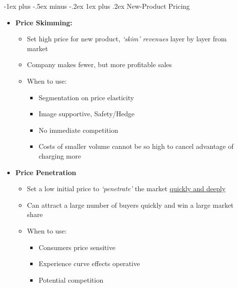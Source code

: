 \documentclass[10pt,landscape]{article}
\makeatletter
\newcommand{\subsubsubsection}{\@startsection{subsubsection}{3}{0mm}%
                                {-1ex plus -.5ex minus -.2ex}%
                                {1ex plus .2ex}%
                                {\normalfont\scriptsize\bfseries}}
\makeatother
\begin{document}
\begin{multicols*}{3}
\subsubsubsection{New-Product Pricing}
\begin{itemize}[topsep=0pt,noitemsep,wide=0pt, leftmargin=\dimexpr{} + 2\relax]
    \item \textbf{Price Skimming:}
    \begin{itemize}[topsep=0pt,noitemsep,wide=0pt, leftmargin=\dimexpr{} + 2\relax]
        \item Set high price for new product, \textit{`skim' revenues} layer by layer from market
        \item Company makes fewer, but more profitable sales
        \item When to use:
        \begin{multicols}{2}
            \begin{itemize}[topsep=0pt,noitemsep,wide=0pt, leftmargin=\dimexpr{} + 2\relax]
                \item Segmentation on price elasticity
                \item Image supportive, Safety/Hedge
                \item No immediate competition
                \item Costs of smaller volume cannot be so high to cancel advantage of charging more
            \end{itemize}
        \end{multicols}
    \end{itemize}
    \item \textbf{Price Penetration}
    \begin{itemize}[topsep=0pt,noitemsep,wide=0pt, leftmargin=\dimexpr{} + 2\relax]
        \item Set a low initial price to \textit{`penetrate'} the market \underline{quickly and deeply}
        \item Can attract a large number of buyers quickly and win a large market share
        \item When to use:
        \begin{multicols}{3}
            \begin{itemize}[topsep=0pt,noitemsep,wide=0pt, leftmargin=\dimexpr{} + 2\relax]
                \item Consumers price sensitive
                \item Experience curve effects operative
                \item Potential competition
            \end{itemize}
        \end{multicols}
    \end{itemize}
\end{itemize}


\end{multicols*}
\end{document}
